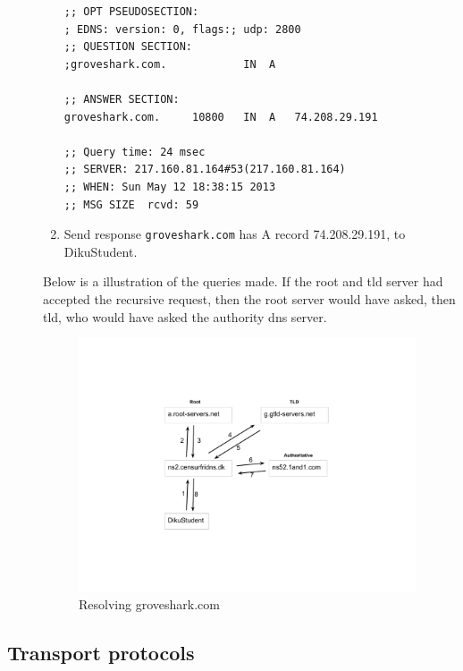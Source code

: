 \begin{description}
\begin{enumerate}
\begin{lstlisting}
;; OPT PSEUDOSECTION:
; EDNS: version: 0, flags:; udp: 2800
;; QUESTION SECTION:
;groveshark.com.            IN  A

;; ANSWER SECTION:
groveshark.com.     10800   IN  A   74.208.29.191

;; Query time: 24 msec
;; SERVER: 217.160.81.164#53(217.160.81.164)
;; WHEN: Sun May 12 18:38:15 2013
;; MSG SIZE  rcvd: 59
                \end{lstlisting}
            \item Send response \texttt{groveshark.com} has A record
                74.208.29.191, to DikuStudent.
        \end{enumerate}
        Below is a illustration of the queries made. If the root and tld server
        had accepted the recursive request, then the root server would have
        asked, then tld, who would have asked the authority dns server.
        \begin{figure}[!h]
        \centering
        \includegraphics[trim = 55mm 30mm 55mm 30mm, clip, width=10cm]{112p3-pic}
        \caption{Resolving groveshark.com}
        \end{figure}

\end{description}

\subsection{Transport protocols}

